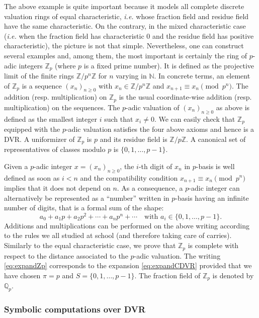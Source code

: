 \documentclass{jT}
\numberwithin{equation}{section}
\theoremstyle{definition}
\newcommand{\N}{\mathbb N}
\newcommand{\Z}{\mathbb Z}
\newcommand{\Zp}{\Z_p}
\newcommand{\Q}{\mathbb Q}
\newcommand{\Qp}{\Q_p}
\begin{document}
The above example is quite important because it models all complete 
discrete valuation rings of equal characteristic, \emph{i.e.} whose 
fraction field and residue field have the same characteristic. On the 
contrary, in the mixed characteristic case (\emph{i.e.} when the 
fraction field has characteristic $0$ and the residue field has positive 
characteristic), the picture is not that simple.
Nevertheless, one can construct several examples and, among them, the 
most important is certainly the ring of $p$-adic integers $\Zp$ (where 
$p$ is a fixed prime number). It is defined as the projective limit of 
the finite rings $\Z/p^n\Z$ for $n$ varying in $\N$. In concrete terms, 
an element of $\Zp$ is a sequence $(x_n)_{n \geq 0}$ with $x_n \in 
\Z/p^n\Z$ and $x_{n+1} \equiv x_n \pmod{p^n}$. The addition (resp. 
multiplication) on $\Zp$ is the usual coordinate-wise addition (resp. 
multiplication) on the sequences. The $p$-adic valuation of $(x_n)_{n 
\geq 0}$ as above is defined as the smallest integer $i$ such that $x_i 
\neq 0$. We can easily check that $\Zp$ equipped with the $p$-adic 
valuation satisfies the four above axioms and hence is a DVR. A
uniformizer of $\Zp$ is $p$ and its residue field is $\Z/p\Z$. A
canonical set of representatives of classes modulo $p$ is $\{0, 1,
\ldots, p-1\}$.

Given a $p$-adic integer $x = (x_n)_{n \geq 0}$, the $i$-th digit of 
$x_n$ in $p$-basis is well defined as soon as $i<n$ and the 
compatibility condition $x_{n+1} \equiv x_n \pmod{p^n}$ implies that 
it does not depend on $n$. As a consequence, a $p$-adic integer can 
alternatively be represented as a ``number'' written in $p$-basis having 
an infinite number of digits, that is a formal sum of the shape:
\begin{equation}
\label{eq:expandZp}
a_0 + a_1 p + a_2 p^2 + \cdots + a_n p^n + \cdots
\quad \text{with } a_i \in \{0, 1, \ldots, p-1\}.
\end{equation}
Additions and multiplications can be performed on the above writing
according to the rules we all studied at school (and therefore taking
care of carries). Similarly to the equal characteristic case, we prove
that $\Zp$ is complete with respect to the distance associated to the 
$p$-adic valuation. The writing \eqref{eq:expandZp} corresponds to the 
expansion \eqref{eq:expandCDVR} provided that we have chosen $\pi = p$ 
and $S = \{0, 1, \ldots, p-1\}$.
The fraction field of $\Zp$ is denoted by $\Qp$.

\subsubsection{Symbolic computations over DVR}
\label{subsubsec:computDVR}
\end{document}

